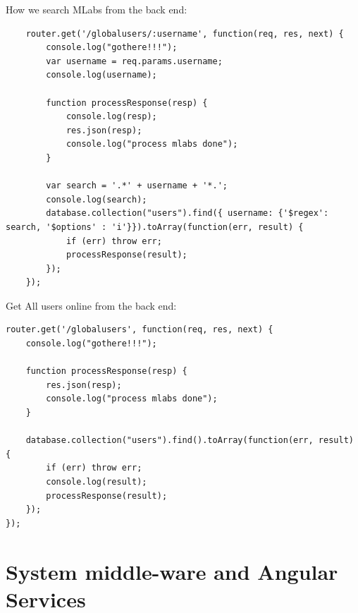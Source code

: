 How we search MLabs from the back end:
\begin{lstlisting}
    router.get('/globalusers/:username', function(req, res, next) {
        console.log("gothere!!!");
        var username = req.params.username;
        console.log(username);
    
        function processResponse(resp) {
            console.log(resp);
            res.json(resp);
            console.log("process mlabs done");
        }
    
        var search = '.*' + username + '*.';
        console.log(search);
        database.collection("users").find({ username: {'$regex': search, '$options' : 'i'}}).toArray(function(err, result) {
            if (err) throw err;
            processResponse(result);
        });
    });
\end{lstlisting}
Get All users online from the back end:
\begin{lstlisting}
router.get('/globalusers', function(req, res, next) {
    console.log("gothere!!!");

    function processResponse(resp) {
        res.json(resp);
        console.log("process mlabs done");
    }

    database.collection("users").find().toArray(function(err, result) {
        if (err) throw err;
        console.log(result);
        processResponse(result);
    });
});
\end{lstlisting}


\section{System middle-ware and Angular Services}

